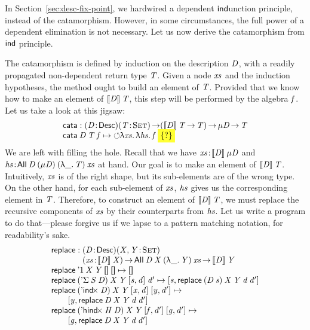 In Section~\ref{sec:desc-fix-point}, we hardwired a dependent
$\F{ind}$unction principle, instead of the catamorphism. However, in
some circumstances, the full power of a dependent elimination is not
necessary. Let us now derive the catamorphism
from $\F{ind}$ principle.

\newcommand{\cata}{\F{cata}}

The catamorphism is defined by induction on the description $\V{D}$,
with a readily propagated non-dependent return type $\V{T}$.
Given a node $\V{xs}$
and the induction hypotheses, the method ought to build an element of
$\V{T}$. Provided that we know how to make an element of
$\descop{\V{D}}{\V{T}}$, this step will be performed by the algebra
$\V{f}$. Let us take a look at this jigsaw:
%
\[\stk{
\cata : \PITEL{\V{D}}{\Desc}
           \PI{\V{T}}{\Set}
           (\descop{\V{D}}{\V{T}} \To \V{T}) \To 
           \Mu{\V{D}} \To \V{T} \\
\cata\: \V{D}\: \V{T}\: \V{f} \mapsto
  \sind \LAM{\V{xs}}\LAM{\V{hs}} \V{f}\: \SHED
}\]
%
We are left with filling the hole. Recall that we have
\(\Bhab{\V{xs}}{\descop{\V{D}}{\Mu{\V{D}}}}\) and
\(\Bhab{\V{hs}}{\All{\V{D}}{(\Mu{\V{D}})}{(\LAM{\_} \V{T})}{\V{xs}}}\)
at hand. Our goal is to make an element of
\(\descop{\V{D}}{\V{T}}\). Intuitively, $\V{xs}$ is of the right
shape, but its sub-elements are of the wrong type. On the other hand,
for each sub-element of $\V{xs}$, $\V{hs}$ gives us the corresponding
element in $\V{T}$.  Therefore, to construct an element of
\(\descop{\V{D}}{\V{T}}\), we must replace the recursive components of
\(\V{xs}\) by their counterparts from \(\V{hs}\). Let us write a
program to do that---please forgive us if we lapse to a pattern matching
notation, for readability's sake.
%
\[\stk{
\F{replace} : \stk{\PITEL{\V{D}}{\Desc}
                   \PITEL{\V{X},\V{Y}}{\Set}\\
                   \PI{\V{xs}}{\descop{\V{D}}{\V{X}}} 
                   \All{\V{D}}{\V{X}}{(\LAM{\_}\V{Y})}{\V{xs}} \To
                   \descop{\V{D}}{\V{Y}}} \\
\F{replace}\: \DUnit\:          \V{X}\: \V{Y}\: \Void\:          \Void          \mapsto 
    \Void                                                                                                         \\
\F{replace}\: (\DSigma{\V{S}}{\V{D}})\: \V{X}\: \V{Y}\: \pair{\V{s}}{\V{d}}{}\: \V{d'}             \mapsto
    \pair{\V{s}}{\F{replace}\: (\V{D}\: \V{s})\: \V{X}\: \V{Y}\: \V{d}\: \V{d'}}{}                                \\
\F{replace}\: (\DIndx{\V{D}})\:     \V{X}\: \V{Y}\: \pair{\V{x}}{\V{d}}{}\: \pair{\V{y}}{\V{d'}}{} \mapsto        \\
\qquad  \pair{\V{y}}{\F{replace}\: \V{D}\: \V{X}\: \V{Y}\: \V{d}\: \V{d'}}{}                                      \\
\F{replace}\: (\DHindx{\V{H}}{\V{D}})\: \V{X}\: \V{Y}\: \pair{\V{f}}{\V{d'}}{}\: \pair{\V{g}}{\V{d'}}{} \mapsto   \\
\qquad  \pair{\V{g}}{\F{replace}\: \V{D}\: \V{X}\: \V{Y}\: \V{d}\: \V{d'}}{}
}\]

